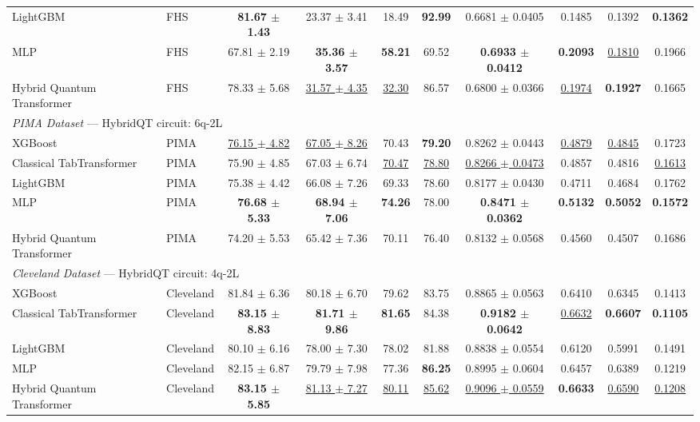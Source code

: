 \begin{table}[!ht]
{\begin{tabular}{llcccccccc}
  LightGBM & FHS & \textbf{81.67 $\pm$ 1.43} & 23.37 $\pm$ 3.41 & 18.49 & \textbf{92.99} & 0.6681 $\pm$ 0.0405 & 0.1485 & 0.1392 & \textbf{0.1362} \\
  MLP & FHS & 67.81 $\pm$ 2.19 & \textbf{35.36 $\pm$ 3.57} & \textbf{58.21} & 69.52 & \textbf{0.6933 $\pm$ 0.0412} & \textbf{0.2093} & \underline{0.1810} & 0.1966 \\
  Hybrid Quantum Transformer & FHS & 78.33 $\pm$ 5.68 & \underline{31.57 $\pm$ 4.35} & \underline{32.30} & 86.57 & 0.6800 $\pm$ 0.0366 & \underline{0.1974} & \textbf{0.1927} & 0.1665 \\
\midrule
\multicolumn{10}{l}{\textit{PIMA Dataset} — HybridQT circuit: 6q-2L} \\
  XGBoost & PIMA & \underline{76.15 $\pm$ 4.82} & \underline{67.05 $\pm$ 8.26} & 70.43 & \textbf{79.20} & 0.8262 $\pm$ 0.0443 & \underline{0.4879} & \underline{0.4845} & 0.1723 \\
  Classical TabTransformer & PIMA & 75.90 $\pm$ 4.85 & 67.03 $\pm$ 6.74 & \underline{70.47} & \underline{78.80} & \underline{0.8266 $\pm$ 0.0473} & 0.4857 & 0.4816 & \underline{0.1613} \\
  LightGBM & PIMA & 75.38 $\pm$ 4.42 & 66.08 $\pm$ 7.26 & 69.33 & 78.60 & 0.8177 $\pm$ 0.0430 & 0.4711 & 0.4684 & 0.1762 \\
  MLP & PIMA & \textbf{76.68 $\pm$ 5.33} & \textbf{68.94 $\pm$ 7.06} & \textbf{74.26} & 78.00 & \textbf{0.8471 $\pm$ 0.0362} & \textbf{0.5132} & \textbf{0.5052} & \textbf{0.1572} \\
  Hybrid Quantum Transformer & PIMA & 74.20 $\pm$ 5.53 & 65.42 $\pm$ 7.36 & 70.11 & 76.40 & 0.8132 $\pm$ 0.0568 & 0.4560 & 0.4507 & 0.1686 \\
\midrule
\multicolumn{10}{l}{\textit{Cleveland Dataset} — HybridQT circuit: 4q-2L} \\
  XGBoost & Cleveland & 81.84 $\pm$ 6.36 & 80.18 $\pm$ 6.70 & 79.62 & 83.75 & 0.8865 $\pm$ 0.0563 & 0.6410 & 0.6345 & 0.1413 \\
  Classical TabTransformer & Cleveland & \textbf{83.15 $\pm$ 8.83} & \textbf{81.71 $\pm$ 9.86} & \textbf{81.65} & 84.38 & \textbf{0.9182 $\pm$ 0.0642} & \underline{0.6632} & \textbf{0.6607} & \textbf{0.1105} \\
  LightGBM & Cleveland & 80.10 $\pm$ 6.16 & 78.00 $\pm$ 7.30 & 78.02 & 81.88 & 0.8838 $\pm$ 0.0554 & 0.6120 & 0.5991 & 0.1491 \\
  MLP & Cleveland & 82.15 $\pm$ 6.87 & 79.79 $\pm$ 7.98 & 77.36 & \textbf{86.25} & 0.8995 $\pm$ 0.0604 & 0.6457 & 0.6389 & 0.1219 \\
  Hybrid Quantum Transformer & Cleveland & \textbf{83.15 $\pm$ 5.85} & \underline{81.13 $\pm$ 7.27} & \underline{80.11} & \underline{85.62} & \underline{0.9096 $\pm$ 0.0559} & \textbf{0.6633} & \underline{0.6590} & \underline{0.1208} \\
\bottomrule
\end{tabular}}
\end{table}
